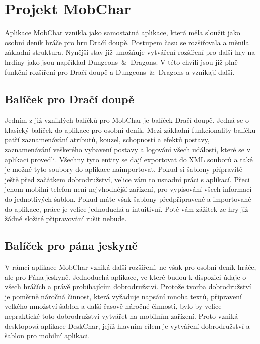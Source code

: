 \documentclass[thesis=B,czech]{resources/FITthesis}[2012/06/26]
\begin{document}
	\section{Projekt MobChar}	
Aplikace MobChar vznikla jako samostatná aplikace, která měla sloužit jako osobní deník hráče pro hru Dračí doupě. Postupem času se rozšiřovala a měnila základní struktura. Nynější stav již umožňuje vytváření rozšíření pro další hry na hrdiny jako jsou například Dungeons~\&~Dragons. V této chvíli jsou již plně funkční rozšíření pro Dračí doupě a Dungeons~\&~Dragons a vznikají další.

\subsection{Balíček pro Dračí doupě}
Jedním z již vzniklých balíčků pro MobChar je balíček Dračí doupě. Jedná se o klasický balíček do aplikace pro osobní deník. Mezi základní funkcionality balíčku patří zaznamenávání atributů, kouzel, schopností a efektů postavy, zaznamenávání veškerého vybavení postavy a logování všech událostí, které se v aplikaci provedli. Všechny tyto entity se dají exportovat do XML souborů a také je možné tyto soubory do aplikace naimportovat. Pokud si šablony přípravitě ještě před začátkem dobrodružství, velice vám to usnadní práci s aplikací. Přeci jenom mobilní telefon není nejvhodnější zařízení, pro vypisování všech informací do jednotlivých šablon. Pokud máte však šablony předpřipravené a importované do aplikace, práce je velice jednoduchá a intuitivní. Poté vám zážitek ze hry již žádné složité připravování rušit nebude. 

\subsection{Balíček pro pána jeskyně}
V rámci aplikace MobChar vzniká další rozšíření, ne však pro osobní deník hráče, ale pro Pána jeskyně. Jednoduchá aplikace, ve které budou k dispozici údaje o všech hráčích a právě probíhajícím dobrodružství. Protože tvorba dobrodružství je poměrně náročná činnost, která vyžaduje napsání mnoha textů, připravení velkého množství šablon a další časově náročné činnosti, bylo by velice nepraktické toto dobrodružství vytvářet na mobilním zařízení. Proto vzniká desktopová aplikace DeskChar, jejíž hlavním cílem je vytváření dobrodružství a šablon pro mobilní aplikaci.
\end{document}
